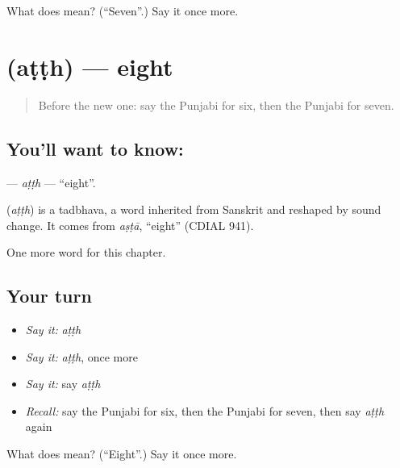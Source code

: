 \begin{tcolorbox}[breakable,colback=teal!4,colframe=teal!35!black,title={Before you move on}]
What does  mean? (\textquotedblleft{}Seven\textquotedblright{}.) Say it once more.
\end{tcolorbox}
\section[\texorpdfstring{\pa{ਅੱਠ} (aṭṭh)}{ਅੱਠ (aṭṭh)}]{ (aṭṭh) — eight}

\label{lesson:PA-C95-atth}



\begin{quote}
Before the new one: say the Punjabi for six, then the Punjabi for seven.
\end{quote}

\subsection*{You'll want to know: }
\textbf{} — \emph{aṭṭh} — \textquotedblleft{}eight\textquotedblright{}.

\begin{cousinweb}
\textbf{} (\emph{aṭṭh}) is a tadbhava, a word inherited from Sanskrit and reshaped by sound change. It comes from \emph{aṣṭā}, \textquotedblleft{}eight\textquotedblright{} (CDIAL 941).
\end{cousinweb}

\begin{grammarlens}[title={What you've built}]
One more word for this chapter.
\end{grammarlens}

\subsection*{Your turn}
\begin{itemize}
\raggedright
  \item \emph{Say it:} \emph{aṭṭh}
  \item \emph{Say it:} \emph{aṭṭh}, once more
  \item \emph{Say it:} say \emph{aṭṭh}
  \item \emph{Recall:} say the Punjabi for six, then the Punjabi for seven, then say \emph{aṭṭh} again
\end{itemize}

\begin{tcolorbox}[breakable,colback=teal!4,colframe=teal!35!black,title={Before you move on}]
What does  mean? (\textquotedblleft{}Eight\textquotedblright{}.) Say it once more.
\end{tcolorbox}
